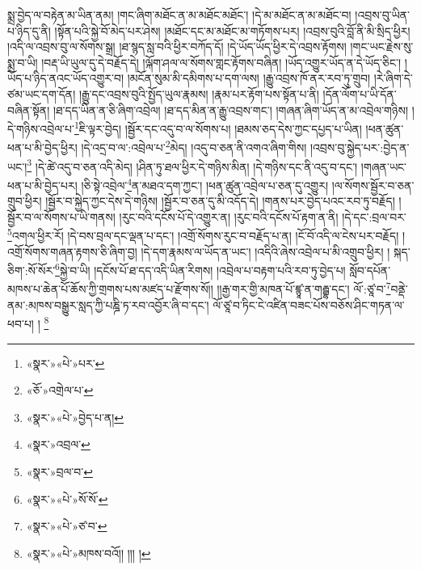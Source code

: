 སྨྲ་བྱེད་ལ་བརྟེན་མ་ཡིན་ནམ། །གང་ཞིག་མཐོང་ན་མ་མཐོང་མཐོང་། །དེ་མ་མཐོང་ན་མ་མཐོང་བ། །འབྲས་བུ་ཡིན་པ་ཉིད་དུ་ནི། །སྟོན་པའི་སྐྱེ་བོ་མེད་པར་ཤེས། །མཐོང་དང་མ་མཐོང་མ་གཏོགས་པར། །འབྲས་བུའི་བློ་ནི་མི་སྲིད་ཕྱིར། །འདི་ལ་འབྲས་བུ་ལ་སོགས་སྒྲ། །ཐ་སྙད་སླ་བའི་ཕྱིར་བཀོད་དོ། །དེ་ཡོད་ཡོད་ཕྱིར་དེ་འབྲས་རྟོགས། །གང་ཡང་རྗེས་སུ་སྨྲ་བ་ཡི། །བརྡ་ཡི་ཡུལ་དུ་དེ་བརྗོད་དེ། །ལྐོག་ཤལ་ལ་སོགས་གླང་རྟོགས་བཞིན། །ཡོད་འགྱུར་ཡོད་ན་དེ་ཡོད་ཅིང་། །ཡོད་པ་ཉིད་ནའང་ཡོད་འགྱུར་བ། །མངོན་སུམ་མི་དམིགས་པ་དག་ལས། །རྒྱུ་འབྲས་ཁོ་ནར་རབ་ཏུ་གྲུབ། །རེ་ཞིག་དེ་ཙམ་ཡང་དག་དོན། །རྒྱུ་དང་འབྲས་བུའི་སྤྱོད་ཡུལ་རྣམས། །རྣམ་པར་རྟོག་པས་སྟོན་པ་ནི། །དོན་ལོག་པ་ཡི་དོན་བཞིན་སྟོན། །ཐ་དད་ཡིན་ན་ཅི་ཞིག་འབྲེལ། །ཐ་དད་མིན་ན་རྒྱུ་འབྲས་གང་། །གཞན་ཞིག་ཡོད་ན་མ་འབྲེལ་གཉིས། །དེ་གཉིས་འབྲེལ་པ་\footnote{«སྣར་»«པེ་»པར་}ཇི་ལྟར་བྱེད། །སྦྱོར་དང་འདུ་བ་ལ་སོགས་པ། །ཐམས་ཅད་དེས་ཀྱང་དཔྱད་པ་ཡིན། །ཕན་ཚུན་ཕན་པ་མི་བྱེད་ཕྱིར། །དེ་འདྲ་བ་ལ་:འབྲེལ་པ་\footnote{«ཅོ་»འགྲེལ་པ་}མེད། །འདུ་བ་ཅན་ནི་འགའ་ཞིག་གིས། །འབྲས་བུ་སྐྱེད་པར་:བྱེད་ན་ཡང་།\footnote{«སྣར་»«པེ་»བྱེད་པ་ན།} །དེ་ཚེ་འདུ་བ་ཅན་འདི་མེད། །ཤིན་ཏུ་ཐལ་ཕྱིར་དེ་གཉིས་མིན། །དེ་གཉིས་དང་ནི་འདུ་བ་དང་། །གཞན་ཡང་ཕན་པ་མི་བྱེད་པར། །ཅི་སྟེ་འབྲེལ་\footnote{«སྣར་»འབྲལ་}ན་མཐའ་དག་ཀྱང་། །ཕན་ཚུན་འབྲེལ་པ་ཅན་དུ་འགྱུར། །ལ་སོགས་སྦྱོར་བ་ཅན་གྲུབ་ཕྱིར། །སྦྱོར་བ་སྐྱེད་ཀྱང་དེས་དེ་གཉིས། །སྦྱོར་བ་ཅན་དུ་མི་འདོད་དེ། །གནས་པར་བྱེད་པའང་རབ་ཏུ་བརྗོད། །སྦྱོར་བ་ལ་སོགས་པ་ཡི་གནས། །རུང་བའི་དངོས་པོ་དེ་འགྱུར་ན། །རུང་བའི་དངོས་པོ་རྟག་ན་ནི། །དེ་དང་:བྲལ་བར་\footnote{«སྣར་»བྲལ་བ་}འགལ་ཕྱིར་རོ། །དེ་བས་བྲལ་དང་ལྡན་པ་དང་། །འགྲོ་སོགས་རུང་བ་བརྗོད་པ་ན། །ངོ་བོ་འདི་ལ་ངེས་པར་བརྗོད། །འགྲོ་སོགས་གཞན་རྟགས་ཅི་ཞིག་བྱ། །དེ་དག་རྣམས་ལ་ཡོད་ན་ཡང་། །འདིའི་ཞེས་འབྲེལ་པ་མི་འགྲུབ་ཕྱིར། །
སྐད་ཅིག་:སོ་སོར་\footnote{«སྣར་»«པེ་»སོ་སོ་}སྐྱེ་བ་ཡི། །དངོས་པོ་ཐ་དད་འདི་ཡིན་རིགས། །འབྲེལ་པ་བརྟག་པའི་རབ་ཏུ་བྱེད་པ། སློབ་དཔོན་མཁས་པ་ཆེན་པོ་ཆོས་ཀྱི་གྲགས་པས་མཛད་པ་རྫོགས་སོ།། །།རྒྱ་གར་གྱི་མཁན་པོ་ཛྙཱ་ན་གརྦྷ་དང་། ལོ་:ཙཱ་བ་\footnote{«སྣར་»«པེ་»ཙ་བ་}བནྡེ་ནམ་:མཁས་བསྒྱུར་སླད་ཀྱི་པཎྜི་ཏ་རབ་འབྱོར་ཞི་བ་དང་། ལོ་ཙཱ་བ་ཏིང་ངེ་འཛིན་བཟང་པོས་བཅོས་ཤིང་གཏན་ལ་ཕབ་པ། ། \footnote{«སྣར་»«པེ་»མཁས་བའོ།། །།། ། }